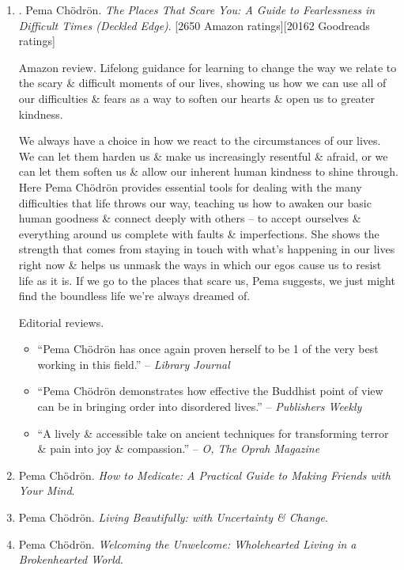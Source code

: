 \documentclass{article}
\begin{document}
\begin{enumerate}
	\item \cite{Chodron_scare}. {\sc Pema Ch\"odr\"on}. {\it The Places That Scare You: A Guide to Fearlessness in Difficult Times (Deckled Edge)}. [2650 Amazon ratings][20162 Goodreads ratings]
	
	{\sf Amazon review.} Lifelong guidance for learning to change the way we relate to the scary \& difficult moments of our lives, showing us how we can use all of our difficulties \& fears as a way to soften our hearts \& open us to greater kindness.
	
	We always have a choice in how we react to the circumstances of our lives. We can let them harden us \& make us increasingly resentful \& afraid, or we can let them soften us \& allow our inherent human kindness to shine through. Here {\sc Pema Ch\"odr\"on} provides essential tools for dealing with the many difficulties that life throws our way, teaching us how to awaken our basic human goodness \& connect deeply with others -- to accept ourselves \& everything around us complete with faults \& imperfections. She shows the strength that comes from staying in touch with what's happening in our lives right now \& helps us unmask the ways in which our egos cause us to resist life as it is. If we go to the places that scare us, {\sc Pema} suggests, we just might find the boundless life we're always dreamed of.
	
	{\sf Editorial reviews.}
	\begin{itemize}
		\item ``{\sc Pema Ch\"odr\"on} has once again proven herself to be 1 of the very best working in this field.'' -- {\it Library Journal}
		\item ``{\sc Pema Ch\"odr\"on} demonstrates how effective the Buddhist point of view can be in bringing order into disordered lives.'' -- {\it Publishers Weekly}
		\item ``A lively \& accessible take on ancient techniques for transforming terror \& pain into joy \& compassion.'' -- {\it O, The Oprah Magazine}
	\end{itemize}
	
	\item {\sc Pema Ch\"odr\"on}. {\it How to Medicate: A Practical Guide to Making Friends with Your Mind}.
	
	\item {\sc Pema Ch\"odr\"on}. {\it Living Beautifully: with Uncertainty \& Change}.
	
	\item {\sc Pema Ch\"odr\"on}. {\it Welcoming the Unwelcome: Wholehearted Living in a Brokenhearted World}.
	

\end{enumerate}
\end{document}
